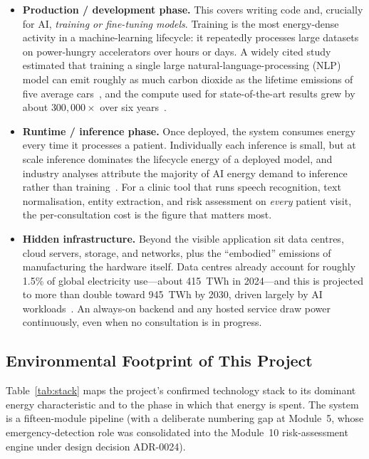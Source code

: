 \documentclass[11pt,a4paper]{article}
\begin{document}
\begin{itemize}
  \item \textbf{Production / development phase.} This covers writing code and,
  crucially for AI, \emph{training or fine-tuning models}. Training is the most
  energy-dense activity in a machine-learning lifecycle: it repeatedly processes large
  datasets on power-hungry accelerators over hours or days. A widely cited study
  estimated that training a single large natural-language-processing (NLP) model can
  emit roughly as much carbon dioxide as the lifetime emissions of five average
  cars~\cite{strubell2019}, and the compute used for state-of-the-art results grew by
  about $300{,}000\times$ over six years~\cite{schwartz2020}.
  \item \textbf{Runtime / inference phase.} Once deployed, the system consumes energy
  every time it processes a patient. Individually each inference is small, but at scale
  inference dominates the lifecycle energy of a deployed model, and industry analyses
  attribute the majority of AI energy demand to inference rather than
  training~\cite{iea2025,luccioni2024}. For a clinic tool that runs speech recognition,
  text normalisation, entity extraction, and risk assessment on \emph{every} patient
  visit, the per-consultation cost is the figure that matters most.
  \item \textbf{Hidden infrastructure.} Beyond the visible application sit data centres,
  cloud servers, storage, and networks, plus the ``embodied'' emissions of manufacturing
  the hardware itself. Data centres already account for roughly 1.5\% of global
  electricity use---about 415~TWh in 2024---and this is projected to more than double
  toward 945~TWh by 2030, driven largely by AI workloads~\cite{iea2025}. An always-on
  backend and any hosted service draw power continuously, even when no consultation is in
  progress.
\end{itemize}

\subsection{Environmental Footprint of This Project}
Table~\ref{tab:stack} maps the project's confirmed technology stack to its dominant
energy characteristic and to the phase in which that energy is spent. The system is a
fifteen-module pipeline (with a deliberate numbering gap at Module~5, whose
emergency-detection role was consolidated into the Module~10 risk-assessment engine under
design decision ADR-0024).
\end{document}
